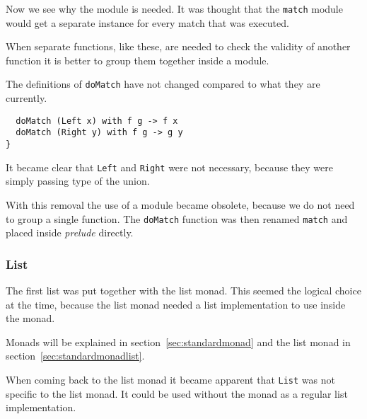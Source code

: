 Now we see why the module is needed.
It was thought that the \texttt{match} module would get a separate instance for every match that was executed.

When separate functions, like these, are needed to check the validity of another function it is better to group them together inside a module.

The definitions of \texttt{doMatch} have not changed compared to what they are currently.

\begin{lstlisting}
  doMatch (Left x) with f g -> f x
  doMatch (Right y) with f g -> g y
}
\end{lstlisting}

It became clear that \texttt{Left} and \texttt{Right} were not necessary, because they were simply passing type of the union.

With this removal the use of a module became obsolete, because we do not need to group a single function.
The \texttt{doMatch} function was then renamed \texttt{match} and placed inside \emph{prelude} directly.





\subsubsection{List}
The first list was put together with the list monad.
This seemed the logical choice at the time, because the list monad needed a list implementation to use inside the monad.

Monads will be explained in section~\ref{sec:standardmonad} and the list monad in section~\ref{sec:standardmonadlist}.

When coming back to the list monad it became apparent that \texttt{List} was not specific to the list monad.
It could be used without the monad as a regular list implementation.

